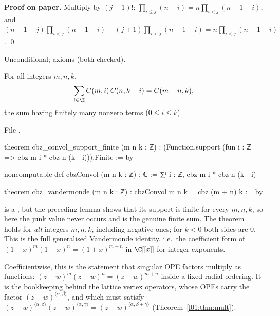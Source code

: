\textbf{Proof on paper.} Multiply by $(j+1)!$:
$\prod_{i\le j}(n-i) = n\prod_{i<j}(n-1-i)$, and
$(n-1-j)\prod_{i<j}(n-1-i) + (j+1)\prod_{i<j}(n-1-i) = n\prod_{i<j}(n-1-i)$. \qed

\begin{status}
Unconditional; axioms  (both checked).
\end{status}

\begin{theorem}\label{l01:thm:vandermonde}
For all integers $m,n,k$,
\begin{equation*}
  \sum_{i\in\Z}C(m,i)\,C(n,k-i) = C(m+n,k),
\end{equation*}
the sum having finitely many nonzero terms ($0\le i\le k$).
\end{theorem}

\noindent File .
\begin{leancode}
theorem cbz_convol_support_finite (m n k : ℤ) :
    (Function.support (fun i : ℤ => cbz m i * cbz n (k - i))).Finite := by

noncomputable def cbzConvol (m n k : ℤ) : ℂ := ∑ᶠ i : ℤ, cbz m i * cbz n (k - i)

theorem cbz_vandermonde (m n k : ℤ) : cbzConvol m n k = cbz (m + n) k := by
\end{leancode}

\begin{dictionary}
 is a , but the preceding lemma shows that its support is finite for every
$m,n,k$, so here the junk value never occurs and  is the genuine finite sum. The
theorem holds for \emph{all} integers $m,n,k$, including negative ones; for $k<0$ both sides are $0$.
This is the full generalised Vandermonde identity, i.e.\ the coefficient form of
$(1+x)^m(1+x)^n = (1+x)^{m+n}$ in $\C[[x]]$ for integer exponents.
\end{dictionary}

\begin{physics}
Coefficientwise, this is the statement that singular OPE factors multiply as functions:
$(z-w)^m(z-w)^n = (z-w)^{m+n}$ inside a fixed radial ordering. It is the bookkeeping behind the
lattice vertex operators, whose OPEs carry the factor $(z-w)^{\langle\alpha,\beta\rangle}$, and which must
satisfy $(z-w)^{\langle\alpha,\beta\rangle}(z-w)^{\langle\alpha,\gamma\rangle} = (z-w)^{\langle\alpha,\beta+\gamma\rangle}$
(Theorem~\ref{l01:thm:mult}).
\end{physics}

